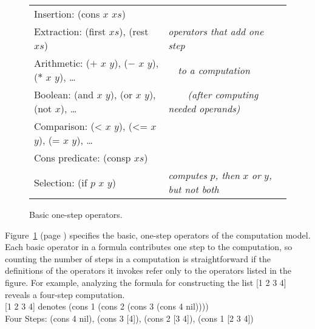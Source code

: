 \begin{figure}
\begin{center}
\begin{spacing}{0.9}
\begin{tabular}{ll}
Insertion: \textsf{(cons $x$ $xs$)}                                       & \\
Extraction: \textsf{(first $xs$)}, \textsf{(rest $xs$)}                            & \emph{operators that add one step}           \\
Arithmetic: \textsf{($+$ $x$ $y$)}, \textsf{($-$ $x$ $y$)}, \textsf{($*$ $x$ $y$)}, \dots   & ~~\emph{to a computation}                    \\
Boolean: \textsf{(and $x$ $y$)}, \textsf{(or $x$ $y$)}, \textsf{(not $x$)}, \dots       & ~~~~\emph{(after computing needed operands)} \\
Comparison: \textsf{(< $x$ $y$)}, \textsf{(<= $x$ $y$)}, \textsf{(= $x$ $y$)}, \dots  & \\
Cons predicate: \textsf{(consp $xs$)}                                     & \\
Selection: \textsf{(if $p$ $x$ $y$)}                                      & \emph{computes} $p$\emph{, then} $x$ \emph{or} $y$\emph{, but not both}
\end{tabular}
\end{spacing}
\end{center}
\caption{Basic one-step operators.}
\label{fig:basic-one-step-ops}
\end{figure}

Figure~\ref{fig:basic-one-step-ops} (page \pageref{fig:basic-one-step-ops})
specifies the basic, one-step operators of
the computation model.
Each basic operator in a formula contributes one step
to the computation, so
counting the number of steps in a computation is straightforward
if the definitions of the operators it invokes refer only
to the operators listed in the figure.
For example, analyzing the formula for constructing
the list \textsf{[1 2 3 4]} reveals a four-step computation.\vspace{2mm}\\
\hspace*{1cm}\textsf{[1 2 3 4]} denotes \textsf{(cons 1 (cons 2 (cons 3 (cons 4 nil))))}\\
\hspace*{1cm}Four Steps: \textsf{(cons 4 nil)}, \textsf{(cons 3 [4])}, \textsf{(cons 2 [3 4])}, \textsf{(cons 1 [2 3 4])}\vspace{2mm}

